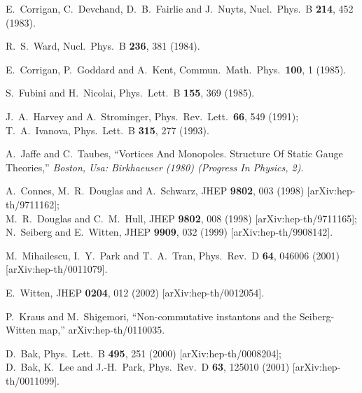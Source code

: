 \documentclass[a4paper,11pt]{article}
\begin{document}
\begin{thebibliography}{99}


E.~Corrigan, C.~Devchand, D.~B.~Fairlie and J.~Nuyts,
Nucl.\ Phys.\ B {\bf 214}, 452 (1983).


R.~S.~Ward,
Nucl.\ Phys.\ B {\bf 236}, 381 (1984).


E.~Corrigan, P.~Goddard and A.~Kent,
Commun.\ Math.\ Phys.\  {\bf 100}, 1 (1985).



S.~Fubini and H.~Nicolai,
Phys.\ Lett.\ B {\bf 155}, 369 (1985).


J.~A.~Harvey and A.~Strominger,
Phys.\ Rev.\ Lett.\  {\bf 66}, 549 (1991);\\
T.~A.~Ivanova,
Phys.\ Lett.\ B {\bf 315}, 277 (1993).




A.~Jaffe and C.~Taubes,
``Vortices And Monopoles. Structure Of Static Gauge Theories,''
{\it  Boston, Usa: Birkhaeuser (1980) %
(Progress In Physics, 2)}.




A.~Connes, M.~R.~Douglas and A.~Schwarz,
JHEP {\bf 9802}, 003 (1998) [arXiv:hep-th/9711162];\\
M.~R.~Douglas and C.~M.~Hull,
JHEP {\bf 9802}, 008 (1998) [arXiv:hep-th/9711165];\\
N.~Seiberg and E.~Witten,
JHEP {\bf 9909}, 032 (1999)
[arXiv:hep-th/9908142].


M.~Mihailescu, I.~Y.~Park and T.~A.~Tran,
Phys.\ Rev.\ D {\bf 64}, 046006 (2001)
[arXiv:hep-th/0011079].


E.~Witten,
JHEP {\bf 0204}, 012 (2002)
[arXiv:hep-th/0012054].

P.~Kraus and M.~Shigemori,
``Non-commutative instantons and the Seiberg-Witten map,''
arXiv:hep-th/0110035.


D.~Bak,
Phys.\ Lett.\ B {\bf 495}, 251 (2000) [arXiv:hep-th/0008204];\\
D.~Bak, K.~Lee and J.-H.~Park,
Phys.\ Rev.\ D {\bf 63}, 125010 (2001)
[arXiv:hep-th/0011099].


\end{thebibliography}
\end{document}
